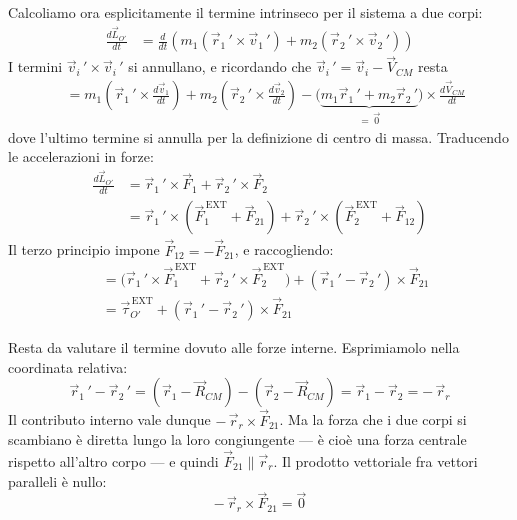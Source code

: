Calcoliamo ora esplicitamente il termine intrinseco per il sistema a due corpi:
\begin{align}
    \frac{d\vec{L}_{O'}}{dt}
    &= \frac{d}{dt}\left( m_1 (\vec{r}_1\,' \times \vec{v}_1\,') + m_2 (\vec{r}_2\,' \times \vec{v}_2\,') \right)
\end{align}
I termini $\vec{v}_i\,' \times \vec{v}_i\,'$ si annullano, e ricordando che $\vec{v}_i\,' = \vec{v}_i - \vec{V}_{CM}$ resta
\begin{align}
    &= m_1 \left( \vec{r}_1\,' \times \frac{d\vec{v}_1}{dt} \right)
     + m_2 \left( \vec{r}_2\,' \times \frac{d\vec{v}_2}{dt} \right)
     - \big(\underbrace{m_1 \vec{r}_1\,' + m_2 \vec{r}_2\,'}_{=\,\vec{0}}\big) \times \frac{d\vec{V}_{CM}}{dt}
\end{align}
dove l'ultimo termine si annulla per la definizione di centro di massa. Traducendo le accelerazioni in forze:
\begin{align}
    \frac{d\vec{L}_{O'}}{dt}
    &= \vec{r}_1\,' \times \vec{F}_1 + \vec{r}_2\,' \times \vec{F}_2 \\
    &= \vec{r}_1\,' \times (\vec{F}_1^{\,\text{EXT}} + \vec{F}_{21})
     + \vec{r}_2\,' \times (\vec{F}_2^{\,\text{EXT}} + \vec{F}_{12})
\end{align}
Il terzo principio impone $\vec{F}_{12} = -\vec{F}_{21}$, e raccogliendo:
\begin{align}
    &= \big(\vec{r}_1\,' \times \vec{F}_1^{\,\text{EXT}} + \vec{r}_2\,' \times \vec{F}_2^{\,\text{EXT}}\big)
       + (\vec{r}_1\,' - \vec{r}_2\,') \times \vec{F}_{21} \\
    &= \vec{\tau}_{O'}^{\,\text{EXT}} + (\vec{r}_1\,' - \vec{r}_2\,') \times \vec{F}_{21}
\end{align}

Resta da valutare il termine dovuto alle forze interne. Esprimiamolo nella coordinata relativa:
\begin{equation*}
    \vec{r}_1\,' - \vec{r}_2\,'
    = (\vec{r}_1 - \vec{R}_{CM}) - (\vec{r}_2 - \vec{R}_{CM})
    = \vec{r}_1 - \vec{r}_2 = -\,\vec{r}_r
\end{equation*}
Il contributo interno vale dunque $-\,\vec{r}_r \times \vec{F}_{21}$. Ma la forza che i due corpi si scambiano è diretta lungo la loro congiungente --- è cioè una forza centrale rispetto all'altro corpo --- e quindi $\vec{F}_{21} \parallel \vec{r}_r$. Il prodotto vettoriale fra vettori paralleli è nullo:
\begin{equation}
    -\,\vec{r}_r \times \vec{F}_{21} = \vec{0}
\end{equation}

